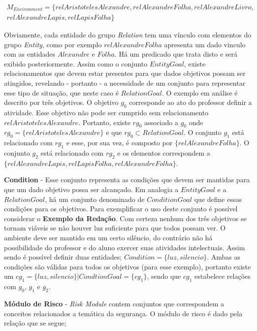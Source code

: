 \begin{eqnarray}\label{Environment}\nonumber
    M_{Environment} = \{ relAristotelesAlexandre, relAlexandreFolha, relAlexandreLivro, \\ \nonumber
     relAlexandreLapis, relLapisFolha \}
\end{eqnarray}

Obviamente, cada entidade do grupo \textit{Relation} tem uma vínculo com elementos do grupo \textit{Entity}, como por exemplo $relAlexandreFolha$ apresenta um dado vinculo com as entidades $Alexandre$ e $Folha$. Há um predicado que trata disto e será exibido posteriormente. Assim como o conjunto $EntityGoal$, existe relacionamentos que devem estar presentes para que dados objetivos possam ser atingidos, revelando - portanto - a necessidade de um conjunto para representar esse tipo de situação, que neste caso é $RelationGoal$. O exemplo em análise é descrito por três objetivos. O objetivo $g_0$ corresponde ao ato  do professor definir a atividade. Esse objetivo não pode ser cumprido sem relacionamento $relAristotelesAlexandre$. Portanto, existe $rg_0$ associado a $g_0$ onde $rg_0 = \{ relAristotelesAlexandre \}$ e que $rg_0 \subset RelationGoal$. O conjunto $g_1$ está relacionado com $rg_1$ e esse, por sua vez, é composto por $\{ relAlexandreFolha\}$. O conjunto $g_2$ está relacionado com $rg_2$ e os elementos correspondem a $\{ relAlexandreLapis, relLapisFolha, relAlexandreFolha\}$.

\textbf{Condition} - Esse conjunto representa as condições que devem ser mantidas para que um dado objetivo possa ser alcançado. Em analogia a $EntityGoal$ e a $RelationGoal$, há um conjunto denominado de $ConditionGoal$ que define essas condições para os objetivos. Para exemplificar o uso deste conjunto é possível considerar o \textbf{Exemplo da Redação}. Com certeza nenhum dos três objetivos se tornam viáveis se não houver luz suficiente para que todos possam ver. O ambiente deve ser mantido em um certo silêncio, do contrário não há possibilidade do professor e do aluno exercer suas atividades intelectuais. Assim sendo é possível definir duas entidades; $Condition = \{ luz,silencio \}$. Ambas as condições são válidas para todos os objetivos (para esse
exemplo), portanto existe um $cg_1 = \{ luz,silencio \} | CondtionGoal = \{ cg_1 \}$, sendo que $cg_1$ estabelece relações com 
$g_0$, $g_1$ e $g_2$.

\textbf{Módulo de Risco} - \textit{Risk Module} contem conjuntos que correspondem a conceitos relacionados a temática da segurança.
O módulo de risco é dado pela relação que se segue;

